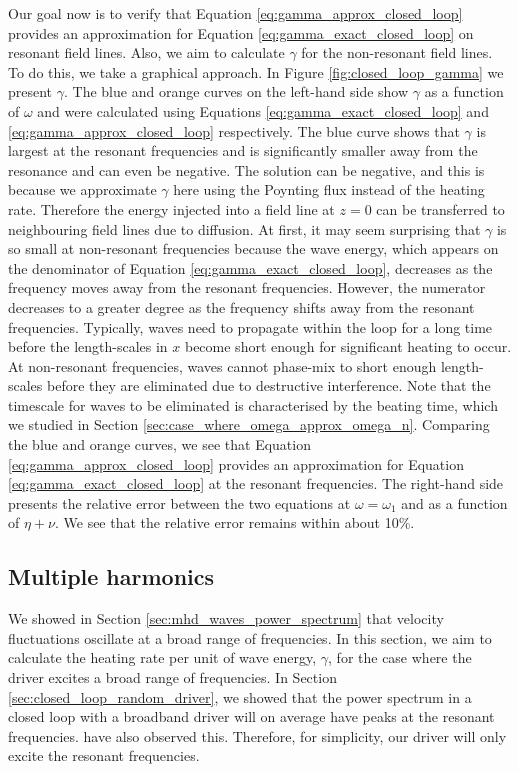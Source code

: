Our goal now is to verify that Equation \eqref{eq:gamma_approx_closed_loop} provides an approximation for Equation \eqref{eq:gamma_exact_closed_loop} on resonant field lines. Also, we aim to calculate $\gamma$ for the non-resonant field lines. To do this, we take a graphical approach. In Figure \ref{fig:closed_loop_gamma} we present $\gamma$. The blue and orange curves on the left-hand side show $\gamma$ as a function of $\omega$ and were calculated using Equations \eqref{eq:gamma_exact_closed_loop} and \eqref{eq:gamma_approx_closed_loop} respectively. The blue curve shows that $\gamma$ is largest at the resonant frequencies and is significantly smaller away from the resonance and can even be negative. The solution can be negative, and this is because we approximate $\gamma$ here using the Poynting flux instead of the heating rate. Therefore the energy injected into a field line at $z=0$ can be transferred to neighbouring field lines due to diffusion. At first, it may seem surprising that $\gamma$ is so small at non-resonant frequencies because the wave energy, which appears on the denominator of Equation \eqref{eq:gamma_exact_closed_loop}, decreases as the frequency moves away from the resonant frequencies. However, the numerator decreases to a greater degree as the frequency shifts away from the resonant frequencies. Typically, waves need to propagate within the loop for a long time before the length-scales in $x$ become short enough for significant heating to occur. At non-resonant frequencies, waves cannot phase-mix to short enough length-scales before they are eliminated due to destructive interference. Note that the timescale for waves to be eliminated is characterised by the beating time, which we studied in Section \ref{sec:case_where_omega_approx_omega_n}. Comparing the blue and orange curves, we see that Equation \eqref{eq:gamma_approx_closed_loop} provides an approximation for Equation \eqref{eq:gamma_exact_closed_loop} at the resonant frequencies. The right-hand side presents the relative error between the two equations at $\omega=\omega_1$ and as a function of $\eta+\nu$. We see that the relative error remains within about 10\%.

\subsection{Multiple harmonics}
\label{sec:chap_3_closed_loop_multiple_harmonics}

We showed in Section \ref{sec:mhd_waves_power_spectrum} that velocity fluctuations oscillate at a broad range of frequencies. In this section, we aim to calculate the heating rate per unit of wave energy, $\gamma$, for the case where the driver excites a broad range of frequencies. In Section \ref{sec:closed_loop_random_driver}, we showed that the power spectrum in a closed loop with a broadband driver will on average have peaks at the resonant frequencies. \citet{Wright1995} have also observed this. Therefore, for simplicity, our driver will only excite the resonant frequencies.

